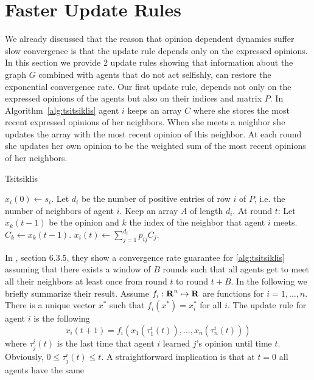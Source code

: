 \section{Faster Update Rules}\label{s:graph_aware}

We already discussed that the reason that opinion dependent dynamics suffer slow
convergence is that the update rule depends only on the expressed opinions.
In this section we provide $2$ update rules showing that information about the
graph $G$ combined with agents that do not act selfishly,
can restore the exponential convergence rate.
Our first update rule, depends not only on the expressed opinions of the
agents but also on their indices and matrix $P$.
In Algorithm~\ref{alg:tsitsiklis} agent $i$
keeps an array $C$ where she stores the most recent expressed opinions of
her neighbors.  When she meets a neighbor she updates the array with the
most recent opinion of this neighbor.
At each round she updates her own opinion to be the weighted sum of the
most recent opinions of her neighbors.
\begin{algorithm}
  \caption{Tsitsiklis}
  \label{alg:tsitsiklis}
  \begin{algorithmic}[1]
    \STATE $x_i(0) \gets s_i$.
    \STATE Let $d_i$ be the number of positive entries of row $i$ of $P$,
    i.e. the number of neighbors of agent $i$.
    \STATE Keep an array $A$ of length $d_i$.
    \STATE At round $t$:
    \bindent
    \STATE Let $x_k(t-1)$ be the opinion and $k$ the index of
    the neighbor that agent $i$ meets.
    \STATE $C_k \gets x_k(t-1)$.
    \STATE $x_i(t) \gets \sum_{j=1}^{d_i} p_{ij} C_j$.
    \eindent
\end{algorithmic}
\end{algorithm}
In \cite{BT97}, section 6.3.5, they show a convergence rate guarantee for
\ref{alg:tsitsiklis} assuming that there exists
a window of $B$ rounds such that all agents get to meet all their
neighbors at least once from round $t$ to round $t+B$.
In the  following we briefly summarize their result. 
Assume $f_i:\bm{\mathrm{R}}^n \mapsto \bm{\mathrm{R}}$ are functions for $i = 1,\ldots,n$. There is 
a unique vector $x^*$ such that $f_i(x^*) = x_i^*$ for all $i$. 
The update rule for agent $i$ is the following
\begin{equation}\label{eq:rule}
x_i(t+1) = f_i(x_1(\tau_1^i(t)),\ldots, x_n(\tau_n^i(t)))
\end{equation}
where $\tau_j^i(t)$ is the last time that agent $i$
learned $j$'s opinion until time $t$. Obviously, $0\leq \tau_j^i(t) \leq t$.
A straightforward implication is that at $t =0$ all agents have the same 
